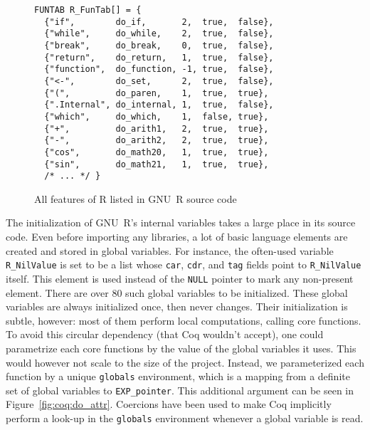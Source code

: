 \documentclass[
    sigplan,
    10pt,
    review, %
    natbib=false %
 ]{acmart}
\begin{document}
\begin{figure}
\begin{verbatim}
FUNTAB R_FunTab[] = {
  {"if",        do_if,       2,  true,  false},
  {"while",     do_while,    2,  true,  false},
  {"break",     do_break,    0,  true,  false},
  {"return",    do_return,   1,  true,  false},
  {"function",  do_function, -1, true,  false},
  {"<-",        do_set,      2,  true,  false},
  {"(",         do_paren,    1,  true,  true},
  {".Internal", do_internal, 1,  true,  false},
  {"which",     do_which,    1,  false, true},
  {"+",         do_arith1,   2,  true,  true},
  {"-",         do_arith2,   2,  true,  true},
  {"cos",       do_math20,   1,  true,  true},
  {"sin",       do_math21,   1,  true,  true},
  /* ... */ }
\end{verbatim}
    \caption{All features of R listed in GNU~R source code}
    \label{fig:names}
\end{figure}

The initialization of GNU~R's internal variables
takes a large place in its source code.
Even before importing any libraries, a lot of basic language elements
are created and stored in global variables.
For instance, the often-used variable \texttt{R_NilValue}
is set to be a list whose \texttt{car}, \texttt{cdr},
and \texttt{tag} fields point to \texttt{R_NilValue} itself.
This element is used instead of the \texttt{NULL} pointer
to mark any non-present element.
There are over \(80\) such global variables to be initialized.
These global variables are always initialized once,
then never changes.
%
Their initialization is subtle, however:
most of them perform local computations, calling core functions.
To avoid this circular dependency (that Coq wouldn't accept),
one could parametrize each core functions by the value of the global variables it uses.
This would however not scale to the size of the project.
%
Instead, we parameterized each function by a unique \texttt{globals}
environment, which is a mapping from a definite set of global variables
to \texttt{EXP_pointer}.
This additional argument can be seen in Figure~\ref{fig:coq:do_attr}.
Coercions have been used to make Coq implicitly perform a look-up
in the \texttt{globals} environment whenever a global variable is read.
\end{document}
